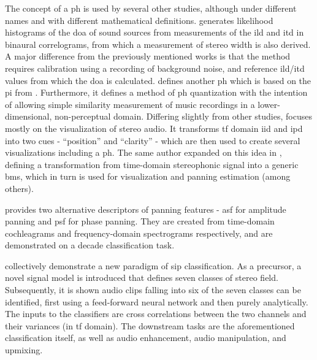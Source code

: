 \documentclass[referee,pdflatex,sn-mathphys-num]{sn-jnl}%
\newcommand{\q}[1]{\enquote{#1}}
\begin{document}
The concept of a \gls{ph} is used by several other studies, although under different names and with different mathematical definitions. \cite{takanenBinauralAuditoryModel2012} generates likelihood histograms of the \gls{doa} of sound sources from measurements of the \gls{ild} and \gls{itd} in binaural correlograms, from which a measurement of stereo width is also derived. A major difference from the previously mentioned works is that the method requires calibration using a recording of background noise, and reference \gls{ild}/\gls{itd} values from which the \gls{doa} is calculated. \cite{gomezMusicSimilaritySystems2008} defines another \gls{ph} which is based on the \gls{pi} from \cite{avendanoFrequencyDomainTechniques2002}. Furthermore, it defines a method of \gls{ph} quantization with the intention of allowing simple similarity measurement of music recordings in a lower-dimensional, non-perceptual domain. Differing slightly from other studies, \cite{prestiVisualizationManipulationStereophonic2014} focuses mostly on the visualization of stereo audio. It transforms \gls{tf} domain \gls{iid} and \gls{ipd} into two cues - \q{position} and \q{clarity} - which are then used to create several visualizations including a \gls{ph}. The same author expanded on this idea in \cite{prestiBivariateMixtureSpace2023}, defining a transformation from time-domain stereophonic signal into a generic \gls{bms}, which in turn is used for visualization and panning estimation (among others).

\cite{tardieuProductionEffectAudio2011} provides two alternative descriptors of panning features - \gls{asf} for amplitude panning and \gls{psf} for phase panning. They are created from time-domain cochleagrams and frequency-domain spectrograms respectively, and are demonstrated on a decade classification task.

\cite{harmaClassificationTimefrequencyRegions2011,harmaStereoAudioClassification2011} collectively demonstrate a new paradigm of \gls{sip} classification. As a precursor, a novel signal model is introduced that defines seven classes of stereo field. Subsequently, it is shown audio clips falling into six of the seven classes can be identified, first using a feed-forward neural network and then purely analytically. The inputs to the classifiers are cross correlations between the two channels and their variances (in \gls{tf} domain). The downstream tasks are the aforementioned classification itself, as well as audio enhancement, audio manipulation, and upmixing.
\end{document}
